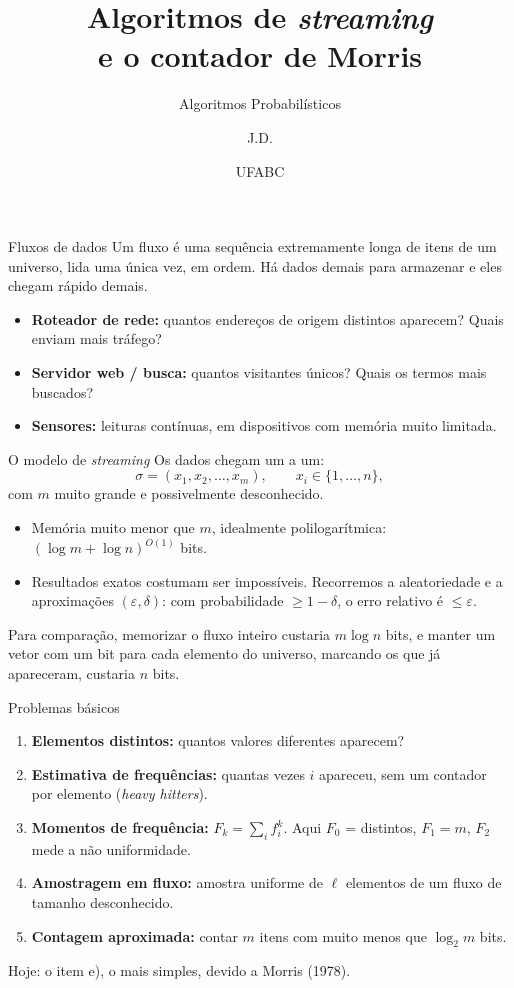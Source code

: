 \documentclass[aspectratio=169,10pt]{beamer}
\title[Streaming e o contador de Morris]{Algoritmos de \textit{streaming}\\e o contador de Morris}
\subtitle{Algoritmos Probabilísticos}
\author{J.D.}
\date{UFABC}
\newcommand{\conj}[1]{\{#1\}}
\begin{document}
\begin{frame}
  \titlepage
\end{frame}

\begin{frame}{Fluxos de dados}
  Um \alert{fluxo} é uma sequência extremamente longa de itens de um
  universo, lida \alert{uma única vez}, em ordem. Há dados demais para
  armazenar e eles chegam rápido demais.
  \medskip
  \begin{itemize}
  \item \textbf{Roteador de rede:} quantos endereços de origem distintos
    aparecem? Quais enviam mais tráfego?
  \item \textbf{Servidor web / busca:} quantos visitantes únicos? Quais
    os termos mais buscados?
  \item \textbf{Sensores:} leituras contínuas, em dispositivos com
    memória muito limitada.
  \end{itemize}
\end{frame}

\begin{frame}{O modelo de \textit{streaming}}
  Os dados chegam um a um:
  \[
    \sigma=(x_1,x_2,\dots,x_m),\qquad x_i\in\conj{1,\dots,n},
  \]
  com $m$ muito grande e possivelmente desconhecido.
  \begin{itemize}
  \item Memória muito menor que $m$, idealmente
    \alert{polilogarítmica}: $(\log m+\log n)^{O(1)}$ bits.
  \item Resultados exatos costumam ser impossíveis. Recorremos a
    \alert{aleatoriedade} e a aproximações $(\varepsilon,\delta)$:
    com probabilidade $\geq1-\delta$, o erro relativo é $\leq\varepsilon$.
  \end{itemize}

  \medskip

  Para comparação, memorizar o fluxo inteiro custaria
  $m\log n$ bits, e manter um vetor com um bit para cada elemento do
  universo, marcando os que já apareceram, custaria $n$ bits.
\end{frame}

\begin{frame}{Problemas básicos}
  \begin{enumerate}
  \item[a)] \textbf{Elementos distintos:} quantos valores diferentes
    aparecem?
  \item[b)] \textbf{Estimativa de frequências:} quantas vezes $i$
    apareceu, sem um contador por elemento (\textit{heavy hitters}).
  \item[c)] \textbf{Momentos de frequência:}
    $F_k=\sum_i f_i^k$. Aqui $F_0$ = distintos, $F_1=m$, $F_2$ mede a
    não uniformidade.
  \item[d)] \textbf{Amostragem em fluxo:} amostra uniforme de $\ell$
    elementos de um fluxo de tamanho desconhecido.
  \item[e)] \textbf{Contagem aproximada:} contar $m$ itens com muito
    menos que $\log_2 m$ bits.
  \end{enumerate}
  \medskip
  Hoje: o item e), o mais simples, devido a Morris (1978).
\end{frame}
\end{document}
